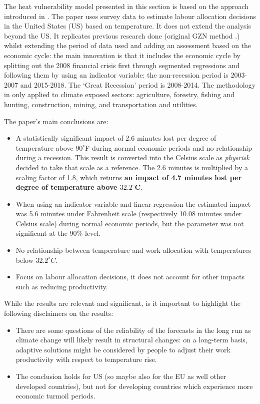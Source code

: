 \documentclass[a4paper,11pt]{extarticle} %
\theoremstyle{definition}
\begin{document}
The heat vulnerability model presented in this section is based on the approach introduced in \cite{NeidellEtAl:2021}. The paper uses survey data to estimate labour allocation decisions in the United States (US) based on temperature. It does not extend the analysis beyond the US. It replicates previous research done (original GZN method \cite{NeidellEtAl:2014}.) whilst extending the period of data used and adding an assessment based on the economic cycle: the main innovation is that it includes the economic cycle by splitting out the 2008 financial crisis first through segmented regressions and following them by using an indicator variable: the non-recession period is 2003-2007 and 2015-2018. The `Great Recession' period is 2008-2014. The methodology in only applied to climate exposed sectors: agriculture, forestry, fishing and hunting, construction, mining, and transportation and utilities.


The paper's main conclusions are:
\begin{itemize}
    \item A statistically significant impact of 2.6 minutes lost per degree of temperature above $90^\circ$F during normal economic periods and no relationship during a recession. This result is converted into the Celsius scale as \emph{physrisk} decided to take that scale as a reference. The 2.6 minutes is multiplied by a scaling factor of 1.8, which returns \textbf{an impact of 4.7 minutes lost per degree of temperature above $\mathbf{32.2^\circ}$C}.
    \item When using an indicator variable and linear regression the estimated impact was 5.6 minutes under Fahrenheit scale (respectively 10.08 minutes under Celsius scale) during normal economic periods, but the parameter was not significant at the 90\% level.
    \item No relationship between temperature and work allocation with temperatures below  $32.2^\circ C$.
    \item Focus on labour allocation decisions, it does not account for other impacts such as reducing productivity.
\end{itemize}

While the results are relevant and significant, is it important to highlight the following disclaimers on the results:
\begin{itemize}
    \item There are some questions of the reliability of the forecasts in the long run as climate change will likely result in structural changes: on a long-term basis, adaptive solutions might be considered by people to adjust their work productivity with respect to temperature rise.
    \item The conclusion holds for US (so maybe also for the EU as well other developed countries), but not for developing countries which experience more economic turmoil periods.
\end{itemize}
\end{document}
